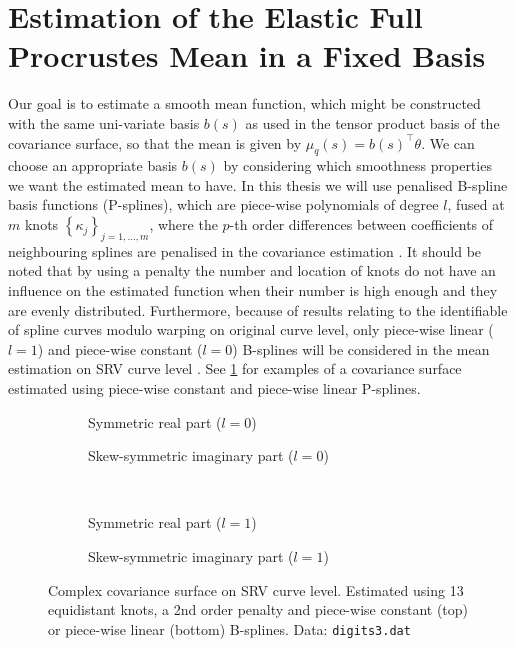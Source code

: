 \section{Estimation of the Elastic Full Procrustes Mean in a Fixed Basis}
\label{sec:3-mean}
Our goal is to estimate a smooth mean function, which might be constructed with the same uni-variate basis $b(s)$ as used in the tensor product basis of the covariance surface, so that the mean is given by $\mu_q(s) = b(s)^\top \theta$.
We can choose an appropriate basis $b(s)$ by considering which smoothness properties we want the estimated mean to have.
In this thesis we will use penalised B-spline basis functions (P-splines), which are piece-wise polynomials of degree $l$, fused at $m$ knots $\left\{\kappa_j\right\}_{j=1,\dots,m}$, where the $p$-th order differences between coefficients of neighbouring splines are penalised in the covariance estimation \parencite[see][Chap.~8.1]{FahrmeierEtAl2013}.
It should be noted that by using a penalty the number and location of knots do not have an influence on the estimated function when their number is high enough and they are evenly distributed.
Furthermore, because of results relating to the identifiable of spline curves modulo warping on original curve level, only piece-wise linear ($l = 1$) and piece-wise constant ($l = 0$) B-splines will be considered in the mean estimation on SRV curve level \parencite[see][]{Steyer2021}.
See \cref{fig:3-cov} for examples of a covariance surface estimated using piece-wise constant and piece-wise linear P-splines.
\begin{figure}[t]
  \centering
  \begin{subfigure}{.48\textwidth}
    \centering
    \caption{Symmetric real part ($l = 0$)}
  \end{subfigure}\hfill%
  \begin{subfigure}{.48\textwidth}
    \centering
    \caption{Skew-symmetric imaginary part ($l = 0$)}
  \end{subfigure}\vspace{0.66em}\\
  \begin{subfigure}{.48\textwidth}
    \centering
    \caption{Symmetric real part ($l = 1$)}
  \end{subfigure}\hfill%
  \begin{subfigure}{.48\textwidth}
    \centering
    \caption{Skew-symmetric imaginary part ($l =1$)}
  \end{subfigure}
  \caption{Complex covariance surface on SRV curve level. Estimated using 13 equidistant knots, a 2nd order penalty and piece-wise constant (top) or piece-wise linear (bottom) B-splines. Data: \texttt{digits3.dat}}
  \label{fig:3-cov}
\end{figure}

